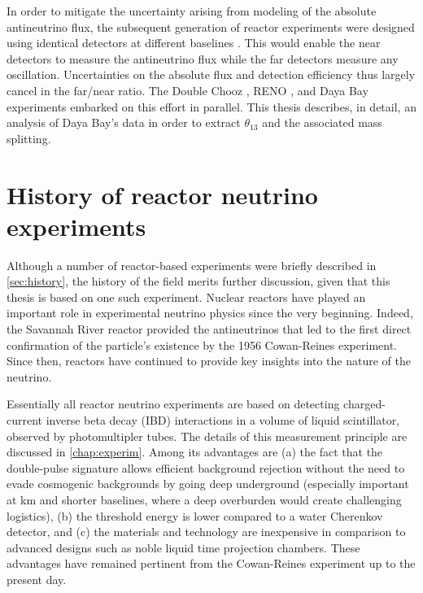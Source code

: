 \documentclass[../thesis.tex]{subfiles}
\begin{document}
In order to mitigate the uncertainty arising from modeling of the absolute antineutrino flux, the subsequent generation of reactor experiments were designed using identical detectors at different baselines \cite{Mikaelyan:1998yg}. This would enable the near detectors to measure the antineutrino flux while the far detectors measure any oscillation. Uncertainties on the absolute flux and detection efficiency thus largely cancel in the far/near ratio. The Double Chooz \cite{Ardellier:2006mn}, RENO \cite{Ahn:2010vy}, and Daya Bay \cite{Guo:2007ug} experiments embarked on this effort in parallel. This thesis describes, in detail, an analysis of Daya Bay's data in order to extract $\theta_{13}$ and the associated mass splitting.


\section{History of reactor neutrino experiments}
\label{sec:introReactor}

Although a number of reactor-based experiments were briefly described in \ref{sec:history}, the history of the field merits further discussion, given that this thesis is based on one such experiment. Nuclear reactors have played an important role in experimental neutrino physics since the very beginning. Indeed, the Savannah River reactor provided the antineutrinos that led to the first direct confirmation of the particle's existence by the 1956 Cowan-Reines experiment. Since then, reactors have continued to provide key insights into the nature of the neutrino.

Essentially all reactor neutrino experiments are based on detecting charged-current inverse beta decay (IBD) interactions in a volume of liquid scintillator, observed by photomultipler tubes. The details of this measurement principle are discussed in \autoref{chap:experim}. Among its advantages are (a) the fact that the double-pulse signature allows efficient background rejection without the need to evade cosmogenic backgrounds by going deep underground (especially important at km and shorter baselines, where a deep overburden would create challenging logistics), (b) the threshold energy is lower compared to a water Cherenkov detector, and (c) the materials and technology are inexpensive in comparison to advanced designs such as noble liquid time projection chambers. These advantages have remained pertinent from the Cowan-Reines experiment up to the present day.
\end{document}
